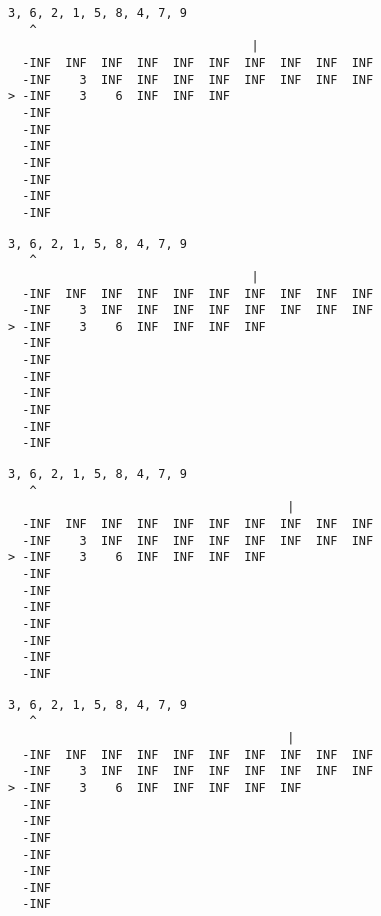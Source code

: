 { \begin{verbatim}
3, 6, 2, 1, 5, 8, 4, 7, 9
   ^
                                  |
  -INF  INF  INF  INF  INF  INF  INF  INF  INF  INF
  -INF    3  INF  INF  INF  INF  INF  INF  INF  INF
> -INF    3    6  INF  INF  INF                    
  -INF                                             
  -INF                                             
  -INF                                             
  -INF                                             
  -INF                                             
  -INF                                             
  -INF                                             
\end{verbatim} }

{ \begin{verbatim}
3, 6, 2, 1, 5, 8, 4, 7, 9
   ^
                                  |
  -INF  INF  INF  INF  INF  INF  INF  INF  INF  INF
  -INF    3  INF  INF  INF  INF  INF  INF  INF  INF
> -INF    3    6  INF  INF  INF  INF               
  -INF                                             
  -INF                                             
  -INF                                             
  -INF                                             
  -INF                                             
  -INF                                             
  -INF                                             
\end{verbatim} }

{ \begin{verbatim}
3, 6, 2, 1, 5, 8, 4, 7, 9
   ^
                                       |
  -INF  INF  INF  INF  INF  INF  INF  INF  INF  INF
  -INF    3  INF  INF  INF  INF  INF  INF  INF  INF
> -INF    3    6  INF  INF  INF  INF               
  -INF                                             
  -INF                                             
  -INF                                             
  -INF                                             
  -INF                                             
  -INF                                             
  -INF                                             
\end{verbatim} }

{ \begin{verbatim}
3, 6, 2, 1, 5, 8, 4, 7, 9
   ^
                                       |
  -INF  INF  INF  INF  INF  INF  INF  INF  INF  INF
  -INF    3  INF  INF  INF  INF  INF  INF  INF  INF
> -INF    3    6  INF  INF  INF  INF  INF          
  -INF                                             
  -INF                                             
  -INF                                             
  -INF                                             
  -INF                                             
  -INF                                             
  -INF                                             
\end{verbatim} }

